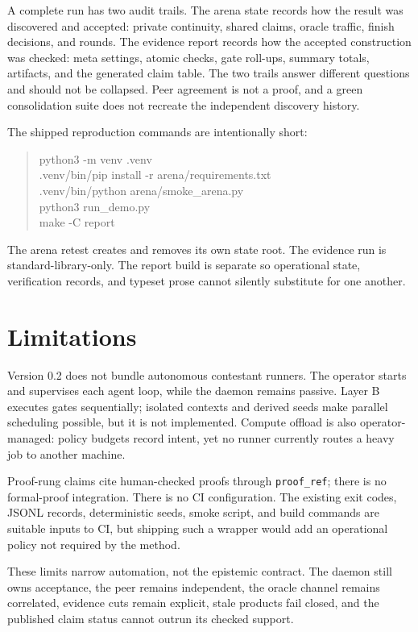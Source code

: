 \documentclass[11pt]{article}
\newcommand{\code}[1]{\texttt{#1}}
\begin{document}
A complete run has two audit trails.  The arena state records how the result
was discovered and accepted: private continuity, shared claims, oracle
traffic, finish decisions, and rounds.  The evidence report records how the
accepted construction was checked: meta settings, atomic checks, gate
roll-ups, summary totals, artifacts, and the generated claim table.  The two
trails answer different questions and should not be collapsed.  Peer
agreement is not a proof, and a green consolidation suite does not recreate
the independent discovery history.

The shipped reproduction commands are intentionally short:

\begin{quote}
\small\ttfamily
python3 -m venv .venv\\
.venv/bin/pip install -r arena/requirements.txt\\
.venv/bin/python arena/smoke\_arena.py\\
python3 run\_demo.py\\
make -C report
\end{quote}

The arena retest creates and removes its own state root.  The evidence run is
standard-library-only.  The report build is separate so operational state,
verification records, and typeset prose cannot silently substitute for one
another.

\section{Limitations}

Version 0.2 does not bundle autonomous contestant runners.  The operator
starts and supervises each agent loop, while the daemon remains passive.
Layer B executes gates sequentially; isolated contexts and derived seeds make
parallel scheduling possible, but it is not implemented.  Compute offload is
also operator-managed: policy budgets record intent, yet no runner currently
routes a heavy job to another machine.

Proof-rung claims cite human-checked proofs through \code{proof\_ref}; there
is no formal-proof integration.  There is no CI configuration.  The existing
exit codes, JSONL records, deterministic seeds, smoke script, and build
commands are suitable inputs to CI, but shipping such a wrapper would add an
operational policy not required by the method.

These limits narrow automation, not the epistemic contract.  The daemon still
owns acceptance, the peer remains independent, the oracle channel remains
correlated, evidence cuts remain explicit, stale products fail closed, and
the published claim status cannot outrun its checked support.
\end{document}
